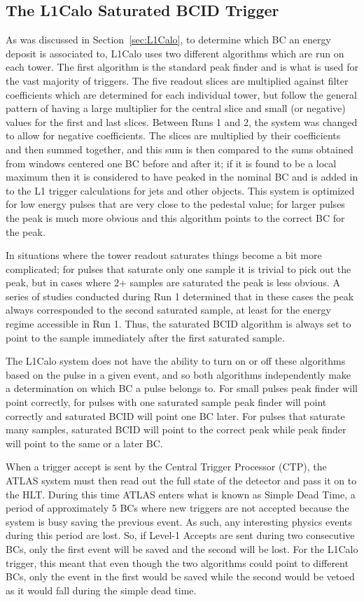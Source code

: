 \subsection{The L1Calo Saturated BCID Trigger}

As was discussed in Section~\ref{sec:L1Calo}, to determine which BC an energy deposit is associated to, L1Calo uses two different algorithms which are run on each tower.  The first algorithm is the standard peak finder and is what is used for the vast majority of triggers.  The five readout slices are multiplied against filter coefficients which are determined for each individual tower, but follow the general pattern of having a large multiplier for the central slice and small (or negative) values for the first and last slices.  Between Runs 1 and 2, the system was changed to allow for negative coefficients. The slices are multiplied by their coefficients and then summed together, and this sum is then compared to the sums obtained from windows centered one BC before and after it; if it is found to be a local maximum then it is considered to have peaked in the nominal BC and is added in to the L1 trigger calculations for jets and other objects.  This system is optimized for low energy pulses that are very close to the pedestal value; for larger pulses the peak is much more obvious and this algorithm points to the correct BC for the peak.

In situations where the tower readout saturates things become a bit more complicated; for pulses that saturate only one sample it is trivial to pick out the peak, but in cases where 2+ samples are saturated the peak is less obvious.  A series of studies conducted during Run 1 determined that in these cases the peak always corresponded to the second saturated sample, at least for the energy regime accessible in Run 1.  Thus, the saturated BCID algorithm is always set to point to the sample immediately after the first saturated sample.

The L1Calo system does not have the ability to turn on or off these algorithms based on the pulse in a given event, and so both algorithms independently make a determination on which BC a pulse belongs to.  For small pulses peak finder will point correctly, for pulses with one saturated sample peak finder will point correctly and saturated BCID will point one BC later.  For pulses that saturate many samples, saturated BCID will point to the correct peak while peak finder will point to the same or a later BC.

When a trigger accept is sent by the Central Trigger Processor (CTP), the ATLAS system must then read out the full state of the detector and pass it on to the HLT.  During this time ATLAS enters what is known as Simple Dead Time, a period of approximately 5 BCs where new triggers are not accepted because the system is busy saving the previous event.  As such, any interesting physics events during this period are lost.  So, if Level-1 Accepts are sent during two consecutive BCs, only the first event will be saved and the second will be lost.  For the L1Calo trigger, this meant that even though the two algorithms could point to different BCs, only the event in the first would be saved while the second would be vetoed as it would fall during the simple dead time.


